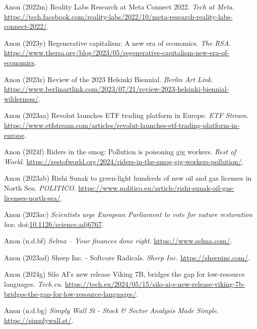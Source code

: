 \documentclass[
  letterpaper,
  DIV=11,
  numbers=noendperiod]{scrartcl}
\newlength{\cslhangindent}
\newenvironment{CSLReferences}[2] %
 {\begin{list}{}{%
  \setlength{\itemindent}{0pt}
  \setlength{\leftmargin}{0pt}
  \setlength{\parsep}{0pt}
  \ifodd #1
   \setlength{\leftmargin}{\cslhangindent}
   \setlength{\itemindent}{-1\cslhangindent}
  \fi
  \setlength{\itemsep}{#2\baselineskip}}}
 {\end{list}}
\begin{document}
\begin{CSLReferences}{0}{1}
Anon (2022m) Reality {Labs Research} at {Meta Connect} 2022. \emph{Tech
at Meta}.
\url{https://tech.facebook.com/reality-labs/2022/10/meta-research-reality-labs-connect-2022/}.

Anon (2023y) Regenerative capitalism: A new era of economics. \emph{The
RSA}.
\url{https://www.thersa.org/blog/2023/05/regenerative-capitalism-new-era-of-economics}.

Anon (2023z) Review of the 2023 {Helsinki Biennial}. \emph{Berlin Art
Link}.
\url{https://www.berlinartlink.com/2023/07/21/review-2023-helsinki-biennial-wilderness/}.

Anon (2023aa) Revolut launches {ETF} trading platform in {Europe}.
\emph{ETF Stream}.
\url{https://www.etfstream.com/articles/revolut-launches-etf-trading-platform-in-europe}.

Anon (2024f) Riders in the smog: {Pollution} is poisoning gig workers.
\emph{Rest of World}.
\url{https://restofworld.org/2024/riders-in-the-smog-gig-workers-pollution/}.

Anon (2023ab) Rishi {Sunak} to green-light hundreds of new oil and gas
licenses in {North Sea}. \emph{POLITICO}.
\url{https://www.politico.eu/article/rishi-sunak-oil-gas-licenses-north-sea/}.

Anon (2023ac) \emph{Scientists urge {European Parliament} to vote for
nature restoration law}.
doi:\href{https://doi.org/10.1126/science.adj6767}{10.1126/science.adj6767}.

Anon (n.d.bf) \emph{Selma -- {Your} finances done right}.
\url{https://www.selma.com/}.

Anon (2023ad) Sheep {Inc}. - {Softcore Radicals}. \emph{Sheep Inc}.
\url{https://sheepinc.com/}.

Anon (2024g) Silo {AI}'s new release {Viking 7B}, bridges the gap for
low-resource languages. \emph{Tech.eu}.
\url{https://tech.eu/2024/05/15/silo-ai-s-new-release-viking-7b-bridges-the-gap-for-low-resource-languages/}.

Anon (n.d.bg) \emph{Simply {Wall St} - {Stock} \& {Sector Analysis Made
Simple}}. \url{https://simplywall.st/}.


\end{CSLReferences}
\end{document}
